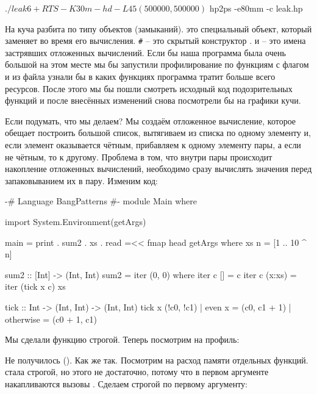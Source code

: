 \begin{code}
$ ./leak 6 +RTS -K30m -hd -L45
(500000,500000)
$ hp2ps -e80mm -c leak.hp
\end{code}

На  куча разбита по типу объектов (замыканий). 
это специальный объект, который заменяет 
во время его вычисления. \verb!#! -- это скрытый конструктор
.  и  -- это имена застрявших
отложенных вычислений. Если бы наша программа была очень большой
на этом месте мы бы запустили профилирование по функциям
с флагом  и из файла  узнали бы в каких
функциях программа тратит больше всего ресурсов.
После этого мы бы пошли смотреть исходный код подозрительных
функций и после внесённых изменений снова посмотрели бы 
на графики кучи. 




Если подумать, что мы делаем? Мы создаём отложенное вычисление,
которое обещает построить большой список, вытягиваем из списка 
по одному элементу и, если элемент оказывается чётным, прибавляем
к одному элементу пары, а если не чётным, то к другому. 
Проблема в том, что внутри пары происходит накопление отложенных
вычислений, необходимо сразу вычислять значения перед запаковыванием
их в пару. Изменим код:

\begin{code}
{-# Language BangPatterns #-}
module Main where

import System.Environment(getArgs)

main = print . sum2 . xs . read =<< fmap head getArgs  
    where xs n = [1 .. 10 ^ n]

sum2 :: [Int] -> (Int, Int)
sum2 = iter (0, 0)
    where iter c  []     = c
          iter c  (x:xs) = iter (tick x c) xs

tick :: Int -> (Int, Int) -> (Int, Int)
tick x (!c0, !c1) | even x    = (c0, c1 + 1)
                  | otherwise = (c0 + 1, c1)
\end{code}
  
Мы сделали функцию  строгой. Теперь посмотрим на профиль:

  
Не получилось (). Как же так. Посмотрим 
на расход памяти отдельных функций.
 стала строгой, но этого не достаточно, потому что
в первом аргументе   накапливаются вызовы .
Сделаем  строгой по первому аргументу:

